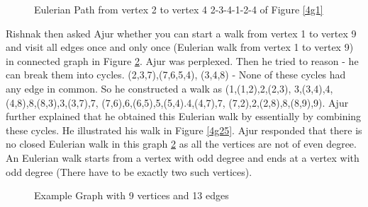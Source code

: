 \begin{figure}
\begin{center}
\caption{ Eulerian Path from vertex 2 to vertex 4 2-3-4-1-2-4 of Figure \ref{4g1}}\label{4g15}
\end{center}
\end{figure}
\vspace{2cm}
Rishnak then asked Ajur whether you can start a walk from vertex 1 to vertex 9 and visit all edges once and only once (Eulerian walk from vertex 1 to vertex 9) in connected graph in Figure \ref{4g2}.
Ajur was perplexed. Then he tried to reason - he can break them into cycles. (2,3,7),(7,6,5,4), (3,4,8)  - None of these cycles had any edge in common. So he constructed a walk as (1,(1,2),2,(2,3),
3,(3,4),4,(4,8),8,(8,3),3,(3,7),7, (7,6),6,(6,5),5,(5,4).4,(4,7),7,
(7,2),2,(2,8),8,(8,9),9). Ajur further explained that he obtained this Eulerian walk by essentially by combining these cycles. He illustrated his walk in Figure \ref{4g25}. Ajur responded that there is no closed Eulerian walk in this graph \ref{4g2} as all the vertices are not of even degree. An Eulerian walk starts from a vertex with odd degree and ends at a vertex with odd degree (There have to be exactly two such vertices).

\begin{figure}
\begin{center}
\caption{ Example Graph with 9 vertices and 13 edges}\label{4g2}
\end{center}
\end{figure}

